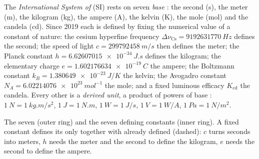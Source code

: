\begin{definition}\label{def:b1:units-dimensions:si}
The \emph{International System of } (SI) rests on seven
\emph{base }: the second (\unit{s}), the meter (\unit{m}), the
kilogram (\unit{kg}), the ampere (\unit{A}), the kelvin (\unit{K}), the
mole (\unit{mol}) and the candela (\unit{cd}). Since 2019 each is
defined by fixing the numerical value of a constant of nature: the
cesium hyperfine frequency $\Delta\nu_{\mathrm{Cs}} = \qty{9192631770}{Hz}$
defines the second; the speed of light $c = \qty{299792458}{m/s}$ then
defines the meter; the Planck constant
$h = \qty{6.62607015e-34}{J.s}$ defines the kilogram; the elementary
charge $e = \qty{1.602176634e-19}{C}$ the ampere; the Boltzmann constant
$k_B = \qty{1.380649e-23}{J/K}$ the kelvin; the Avogadro constant
$N_A = \qty{6.02214076e23}{mol^{-1}}$ the mole; and a fixed luminous
efficacy $K_{\mathrm{cd}}$ the candela. Every other  is a
\emph{derived unit}, a product of powers of base
: $\qty{1}{N} = \qty{1}{kg.m/s^2}$, $\qty{1}{J} = \qty{1}{N.m}$,
$\qty{1}{W} = \qty{1}{J/s}$, $\qty{1}{V} = \qty{1}{W/A}$,
$\qty{1}{Pa} = \qty{1}{N/m^2}$.
\end{definition}

\begin{omfigure}

{\small The seven  (outer ring) and the seven defining
constants (inner ring). A fixed constant defines its  only together
with  already defined (dashed): $c$ turns seconds into meters, $h$
needs the meter and the second to define the kilogram, $e$ needs the
second to define the ampere.}
\end{omfigure}

